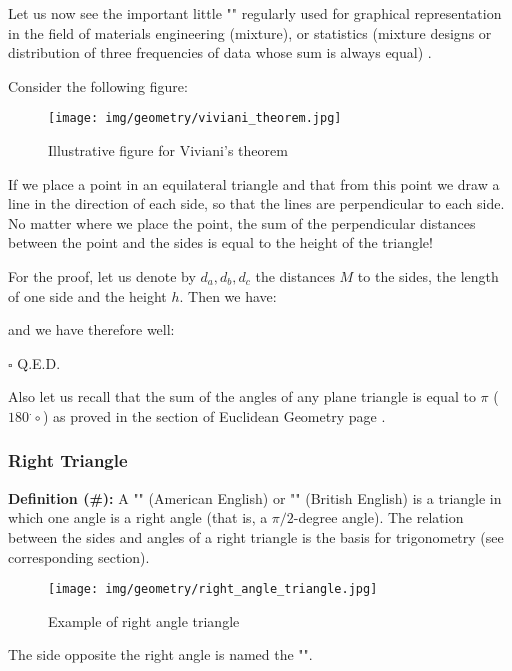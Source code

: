 {	Let us now see the important little "" regularly used for graphical representation in the field of materials engineering (mixture), or statistics (mixture designs or distribution of three frequencies of data whose sum is always equal) .
	
	Consider the following figure:
	\begin{figure}[H]
		\centering
		\texttt{[image: img/geometry/viviani\_theorem.jpg]}
		\caption{Illustrative figure for Viviani's theorem}
	\end{figure}
	\begin{theorem}
	If we place a point in an equilateral triangle and that from this point we draw a line in the direction of each side, so that the lines are perpendicular to each side. No matter where we place the point, the sum of the perpendicular distances between the point and the sides is equal to the height of the triangle!
	\end{theorem}
	\begin{dem}
	For the proof, let us denote by $d_a,d_b,d_c$ the distances $M$ to the sides, the length of one side and the height $h$. Then we have:
	
	and we have therefore well:
	
	\begin{flushright}
		$\square$  Q.E.D.
	\end{flushright}
	\end{dem} 
	Also let us recall that the sum of the angles of any plane triangle is equal to $\pi$ ($180^.\circ$) as proved in the section of Euclidean Geometry page \pageref{angle sum theorem}.
	
	\subsubsection{Right Triangle}
	\textbf{Definition (\#\mydef):} A "" (American English) or "" (British English) is a triangle in which one angle is a right angle (that is, a $\pi/2$-degree angle). The relation between the sides and angles of a right triangle is the basis for trigonometry (see corresponding section).
	\begin{figure}[H]
		\centering
		\texttt{[image: img/geometry/right\_angle\_triangle.jpg]}
		\caption{Example of right angle triangle}
	\end{figure}
	The side opposite the right angle is named the "".
	
}
